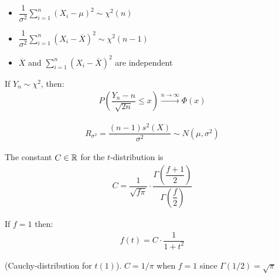 \par\bigskip
\begin{lem}{}
  \begin{itemize}
    \item$\dfrac{1}{\sigma^2}\sum_{i=1}^{n}(X_i-\mu)^2\sim\chi^2(n)$
      \par\bigskip
    \item $\dfrac{1}{\sigma^2}\sum_{i=1}^{n}(X_i-\overline{X})^2\sim\chi^2(n-1)$
      \par\bigskip
    \item $\overline{X}$ and $\sum_{i=1}^{n}(X_i-\overline{X})^2$ are independent
  \end{itemize}
\end{lem}
\par\bigskip
\begin{theo}{}
  If $Y_n\sim \chi^2$, then:
  \begin{equation*}
    \begin{gathered}
      P\left(\dfrac{Y_n-n}{\sqrt{2n}}\leq x\right)\stackrel{n\to\infty}{\to}\Phi(x)
    \end{gathered}
  \end{equation*}
\end{theo}
\par\bigskip
\begin{lem}{}
  \begin{equation*}
    \begin{gathered}
      R_ {\sigma^2} = \dfrac{(n-1)s^2(X)}{\sigma^2}\sim N(\mu,\sigma^2)
    \end{gathered}
  \end{equation*}
\end{lem}
\newpage
\begin{lem}
  The constant $C\in\mathbb{R}$ for the $t$-distribution is
  \begin{equation*}
    \begin{gathered}
      C = \dfrac{1}{\sqrt{f\pi}}\cdot\dfrac{\Gamma\left(\dfrac{f+1}{2}\right)}{\Gamma\left(\dfrac{f}{2}\right)}
    \end{gathered}
  \end{equation*}
  \par\bigskip
  \noindent If $f = 1$ then:
  \begin{equation*}
    \begin{gathered}
      f(t) = C\cdot\dfrac{1}{1+t^2}
    \end{gathered}
  \end{equation*}\par
  \noindent (Cauchy-distribution for $t(1)$). $C = 1/\pi$ when $f= 1$ since $\Gamma(1/2) = \sqrt{\pi}$
\end{lem}
